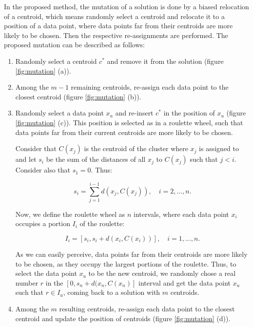 In the proposed method, the mutation of a solution is done by a biased relocation of a centroid, which means randomly select a centroid and relocate it to a position of a data point, where data points far from their centroids are more likely to be chosen. Then the respective re-assignments are performed. The proposed mutation can be described as follows:

\begin{enumerate}

	\item Randomly select a centroid $c^{*}$ and remove it from the solution (figure \ref{fig:mutation} (a)).
	
	\item Among the $m-1$ remaining centroids, re-assign each data point to the closest centroid (figure \ref{fig:mutation} (b)).
	
	\item Randomly select a data point $x_u$ and re-insert $c^{*}$ in the position of $x_u$ (figure \ref{fig:mutation} (c)). This position is selected as in a roulette wheel, such that data points far from their current centroids are more likely to be chosen.
	
	Consider that $C(x_j)$ is the centroid of the cluster where $x_j$ is assigned to and let $s_i$ be the sum of the distances of all $x_j$ to $C(x_j)$ such that $j < i$. Consider also that $s_1 = 0$. Thus:
	
	\begin{equation}
	s_i = \sum_{j=1}^{i-1} d(x_j, C(x_j)), \quad i = 2, ..., n.
	\end{equation}
	
	Now, we define the roulette wheel as $n$ intervals, where each data point $x_i$ occupies a portion $I_i$ of the roulette:
	
	\begin{equation}
	I_i = [ s_i, s_i + d(x_i, C(x_i)) ], \quad i = 1, ..., n.
	\end{equation}
	
	As we can easily perceive, data points far from their centroids are more likely to be chosen, as they occupy the largest portions of the roulette. Thus, to select the data point $x_u$ to be the new centroid, we randomly chose a real number $r$ in the $[ 0, s_n + d(x_n, C(x_n) ]$ interval and get the data point $x_u$ such that $r \in I_u$, coming back to a solution with $m$ centroids.
	
	\item Among the $m$ resulting centroids, re-assign each data point to the closest centroid and update the position of centroids (figure \ref{fig:mutation} (d)).
		
\end{enumerate}

